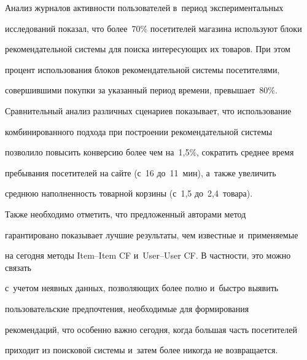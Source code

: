 Анализ журналов активности пользователей в~период экспериментальных 


исследований показал, что более~70\% посетителей магазина используют блоки 


рекомендательной системы для поиска интересующих их товаров. При этом 


процент использования блоков рекомендательной системы посетителями, 


совершившими покупки за указанный период времени, превышает~80\%. 


Сравнительный анализ различных сценариев показывает, что использование 


комбинированного подхода при построении рекомендательной системы 


позволило повысить конверсию более чем на~1,5\%, сократить среднее время 


пребывания посетителей на сайте (с~16 до~11~мин), а~также увеличить 


среднюю наполненность товарной корзины (с~1,5 до~2,4~товара). 


  


  Также необходимо отметить, что предложенный авторами метод 


гарантировано показывает лучшие результаты, чем известные и~применяемые 


на сегодня методы Item--Item CF и~User--User CF. В частности, это можно связать 


с~учетом неявных данных, позволяющих более полно и~быстро выявить 


пользовательские предпочтения, необходимые для формирования 


рекомендаций, что особенно важно сегодня, когда большая часть посетителей 


приходит из поисковой системы и~затем более никогда не возвращается.





\vspace*{-4pt}


  


